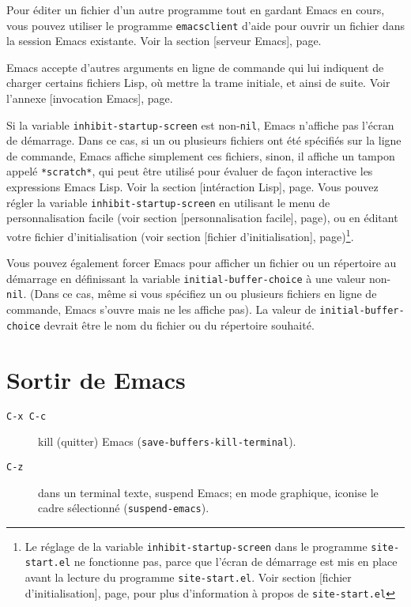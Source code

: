 Pour éditer un fichier d'un autre programme tout en gardant Emacs en
cours, vous pouvez utiliser le programme \texttt{emacsclient} d'aide
pour ouvrir un fichier dans la session Emacs existante. Voir la
section [serveur Emacs],
page.\par 

Emacs accepte d'autres arguments en ligne de commande qui lui
indiquent de charger certains fichiers Lisp, où mettre la trame
initiale, et ainsi de suite. Voir l'annexe [invocation
Emacs], page.\par 

Si la variable \texttt{inhibit-startup-screen} est non-\texttt{nil},
Emacs n'affiche pas l'écran de démarrage. Dans ce cas, si un ou
plusieurs fichiers ont été spécifiés sur la ligne de commande, Emacs
affiche simplement ces fichiers, sinon, il affiche un tampon appelé
\texttt{*scratch*}, qui peut être utilisé pour évaluer de façon
interactive les expressions Emacs Lisp. Voir la
section [intéraction Lisp],
page. Vous pouvez régler la variable
\texttt{inhibit-startup-screen} en utilisant le menu de
personnalisation facile (voir section
[personnalisation facile], page), ou en éditant
votre fichier d'initialisation (voir section [fichier
d'initialisation], page)\footnote{Le réglage
  de la variable \texttt{inhibit-startup-screen} dans le programme
  \texttt{site-start.el} ne fonctionne pas, parce que l'écran de
  démarrage est mis en place avant la lecture du programme
  \texttt{site-start.el}. Voir section [fichier
  d'initialisation], page, pour plus
  d'information à propos de \texttt{site-start.el}}.\par 

Vous pouvez également forcer Emacs pour afficher un fichier ou un
répertoire au démarrage en définissant la variable
\texttt{initial-buffer-choice} à une valeur non-\texttt{nil}. (Dans ce
cas, même si vous spécifiez un ou plusieurs fichiers en ligne de
commande, Emacs s'ouvre mais ne les affiche pas). La valeur de
\texttt{initial-buffer-choice} devrait être le nom du fichier ou du
répertoire souhaité.\par 

  
\section{Sortir de Emacs}
\begin{description}
\item[\texttt{C-x C-c}] kill (quitter) Emacs
  (\texttt{save-buffers-kill-terminal}).
\item[\texttt{C-z}] dans un terminal texte, suspend Emacs; en mode
  graphique, iconise le cadre sélectionné (\texttt{suspend-emacs}).
\end{description}

